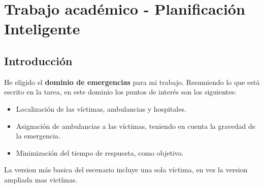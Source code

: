 

\chapter{Trabajo académico - Planificación Inteligente}

\lstset{language=python}




\section{Introducción}

He eligido el \textbf{dominio de emergencias} para mi trabajo. Resumiendo lo que está escrito en la tarea, en este dominio los puntos de interés son los siguientes:
\begin{itemize}
   \item Localización de las víctimas, ambulancias y hospitales.
   \item Asignación de ambulancias a las víctimas, teniendo en cuenta la gravedad de la emergencia.
   \item Minimización del tiempo de respuesta, como objetivo.
\end{itemize}

La version más basica del escenario incluye una sola víctima, en vez la version ampliada mas victímas.

